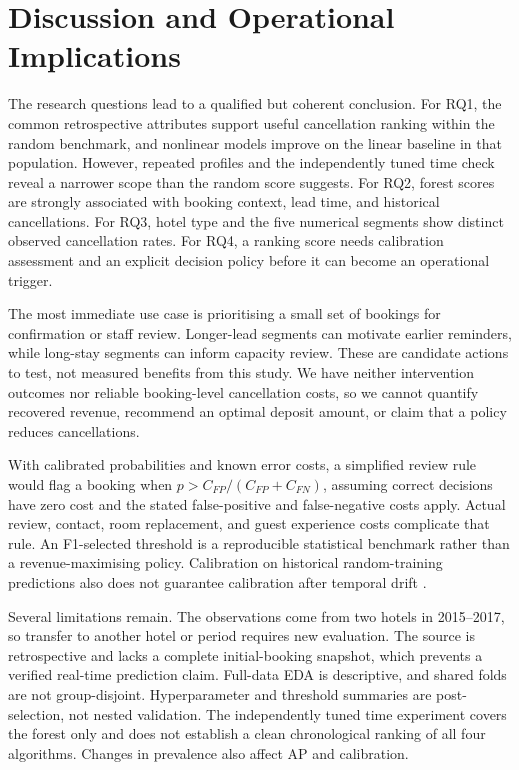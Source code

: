 \section{Discussion and Operational Implications}
The research questions lead to a qualified but coherent conclusion. For RQ1, the common retrospective attributes support useful cancellation ranking within the random benchmark, and nonlinear models improve on the linear baseline in that population. However, repeated profiles and the independently tuned time check reveal a narrower scope than the random score suggests. For RQ2, forest scores are strongly associated with booking context, lead time, and historical cancellations. For RQ3, hotel type and the five numerical segments show distinct observed cancellation rates. For RQ4, a ranking score needs calibration assessment and an explicit decision policy before it can become an operational trigger.

The most immediate use case is prioritising a small set of bookings for confirmation or staff review. Longer-lead segments can motivate earlier reminders, while long-stay segments can inform capacity review. These are candidate actions to test, not measured benefits from this study. We have neither intervention outcomes nor reliable booking-level cancellation costs, so we cannot quantify recovered revenue, recommend an optimal deposit amount, or claim that a policy reduces cancellations.

With calibrated probabilities and known error costs, a simplified review rule would flag a booking when \(p>C_{FP}/(C_{FP}+C_{FN})\), assuming correct decisions have zero cost and the stated false-positive and false-negative costs apply. Actual review, contact, room replacement, and guest experience costs complicate that rule. An F1-selected threshold is a reproducible statistical benchmark rather than a revenue-maximising policy. Calibration on historical random-training predictions also does not guarantee calibration after temporal drift \citep{sklearncalibration}.

Several limitations remain. The observations come from two hotels in 2015--2017, so transfer to another hotel or period requires new evaluation. The source is retrospective and lacks a complete initial-booking snapshot, which prevents a verified real-time prediction claim. Full-data EDA is descriptive, and shared folds are not group-disjoint. Hyperparameter and threshold summaries are post-selection, not nested validation. The independently tuned time experiment covers the forest only and does not establish a clean chronological ranking of all four algorithms. Changes in prevalence also affect AP and calibration.

